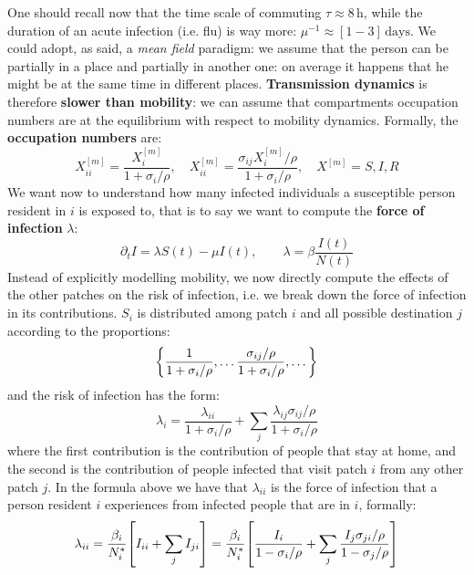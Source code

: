 \documentclass[../main/main.tex]{subfiles}
\begin{document}
One should recall now that the time scale of commuting $\tau \approx 8\,\text{h}$, while the duration of an acute infection (i.e. flu) is way more: $\mu^{-1} \approx [1-3]\, \text{days}$. We could adopt, as said, a \textit{mean field} paradigm: we assume that the person can be partially in a place and partially in another one: on average it happens that he might be at the same time in different places. \textbf{Transmission dynamics} is therefore \textbf{slower than mobility}: we can assume that compartments occupation numbers are at the equilibrium with respect to mobility dynamics. Formally, the \textbf{occupation numbers} are:
\begin{equation}
    X_{ii}^{[m]} = \frac{X_i^{[m]}}{1+\sigma_i/\rho}, \quad X_{ii}^{[m]} = \frac{\sigma_{ij}X_i^{[m]}/\rho}{1+\sigma_i/\rho}, \quad X^{[m]} = S,I,R
\end{equation}
We want now to understand how many infected individuals a susceptible person resident in $i$ is exposed to, that is to say we want to compute the \textbf{force of infection} $\lambda$:
\begin{equation}
    \partial_t I = \lambda S(t) - \mu I (t), \qquad \lambda = \beta \frac{I(t)}{N(t)}
\end{equation}
Instead of explicitly modelling mobility, we now directly compute the effects of the other patches on the risk of infection, i.e. we break down the force of infection in its
contributions.
$S_i$ is distributed among patch $i$ and all possible destination $j$ according to the proportions:
\begin{equation*}
    \qty{ \frac{1}{1+\sigma_i/\rho}, \dots \frac{\sigma_{ij}/\rho}{1+\sigma_i/\rho}, \dots  }
\end{equation*}
and the risk of infection has the form:
\begin{equation}
    \lambda_i = \frac{\lambda_{ii}}{1+\sigma_i/\rho} + \sum_{j} \frac{\lambda_{ij}\sigma_{ij}/\rho}{1+\sigma_i/\rho}
\end{equation}
where the first contribution is the contribution of people that stay at home, and the second is the contribution of people infected that visit patch $i$ from any other patch $j$.
In the formula above we have that $\lambda_{ii}$ is the force of infection that a person resident $i$ experiences from infected people that are in $i$, formally:
\begin{equation}
    \lambda_{ii} = \frac{\beta_i}{N_i^*} \qty[ I_{ii} + \sum_j I_{ji} ] = \frac{\beta_i}{N_i^*} \qty[ \frac{I_i}{1-\sigma_i/\rho} + \sum_j \frac{I_j \sigma_{ji}/\rho}{1-\sigma_j/\rho} ]
\end{equation}
\end{document}
